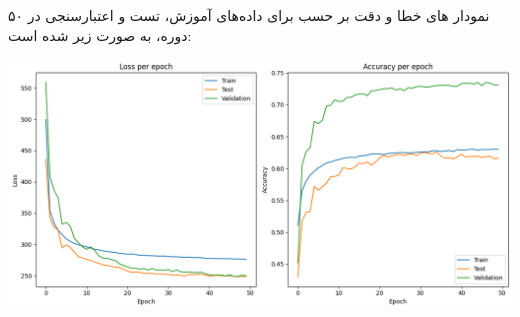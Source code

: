 \begin{qsolve}
	نمودار های خطا و دقت بر حسب  برای داده‌های آموزش، تست و اعتبارسنجی در ۵۰ دوره، به صورت زیر شده است:
	\begin{center}
		\includegraphics*[width=0.8\linewidth]{pics/img16.png}
		\label{نمودار خطا و دقت}
	\end{center}
	
\end{qsolve}